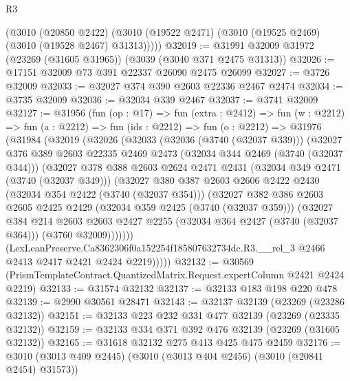 \begin{lexlean}{R3}
\begin{coremodule}
      (@3010
        (@20850 @2422)
        (@3010 (@19522 @2471) (@3010 (@19525 @2469) (@3010 (@19528 @2467) @31313)))))
@32019 := @31991 @32009 @31972 (@23269 (@31605 @31965)) (@3039 (@3040 @371 @2475 @31313))
@32026 := @17151 @32009 @73 @391 @22337 @26090 @2475 @26099
@32027 := @3726 @32009
@32033 := @32027 @374 @390 @2603 @22336 @2467 @2474
@32034 := @3735 @32009
@32036 := @32034 @339 @2467
@32037 := @3741 @32009
@32127 := @31956
    (fun (op : @17) =>
    fun (extra : @2412) =>
    fun (w : @2212) =>
    fun (a : @2212) =>
    fun (ids : @2212) =>
    fun (o : @2212) =>
    @31976
      (@31984
        (@32019
          (@32026
            (@32033
              (@32036 (@3740 (@32037 @339)))
              (@32027
                @376
                @389
                @2603
                @22335
                @2469
                @2473
                (@32034 @344 @2469 (@3740 (@32037 @344)))
                (@32027
                  @378
                  @388
                  @2603
                  @2624
                  @2471
                  @2431
                  (@32034 @349 @2471 (@3740 (@32037 @349)))
                  (@32027
                    @380
                    @387
                    @2603
                    @2606
                    @2422
                    @2430
                    (@32034 @354 @2422 (@3740 (@32037 @354)))
                    (@32027
                      @382
                      @386
                      @2603
                      @2605
                      @2425
                      @2429
                      (@32034 @359 @2425 (@3740 (@32037 @359)))
                      (@32027
                        @384
                        @214
                        @2603
                        @2603
                        @2427
                        @2255
                        (@32034 @364 @2427 (@3740 (@32037 @364)))
                        (@3760 @32009)))))))
            (LexLeanPreserve.Ca8362306f0a152254f185807632734dc.R3.__rel_3
              @2466
              @2413
              @2417
              @2421
              @2424
              @2219)))))
@32132 := @30569 (PrismTemplateContract.QuantizedMatrix.Request.expertColumn @2421 @2424 @2219)
@32133 := @31574 @32132
@32137 := @32133 @183 @198 @220 @478
@32139 := @2990 @30561 @28471
@32143 := @32137 @32139 (@23269 (@23286 @32132))
@32151 := @32133 @223 @232 @331 @477 @32139 (@23269 (@23335 @32132))
@32159 := @32133 @334 @371 @392 @476 @32139 (@23269 (@31605 @32132))
@32165 := @31618 @32132 @275 @413 @425 @475 @2459
@32176 := @3010 (@3013 @409 @2445) (@3010 (@3013 @404 @2456) (@3010 (@20841 @2454) @31573))

\end{coremodule}
\end{lexlean}
